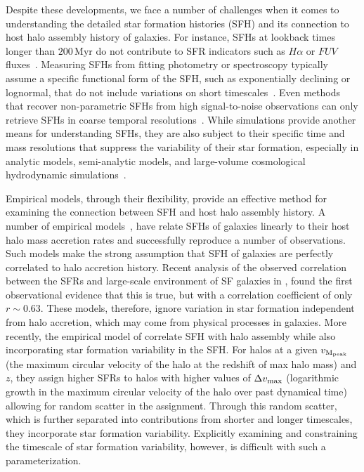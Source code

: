 \documentclass[12pt, letterpaper, preprint, tighten]{aastex62}
\newcommand{\edt}[1]{{\color{dred}{\bf} #1}}
\begin{document}
Despite these developments, we face a number of challenges when it comes
to understanding the detailed star formation histories (SFH) and its
connection to host halo assembly history of galaxies.
For instance, SFHs at lookback times longer than $200\,\mathrm{Myr}$
do not contribute to SFR indicators such as $H\alpha$ or $FUV$ fluxes~\cite{sparre2017}.
Measuring SFHs from fitting photometry or spectroscopy typically
assume a specific functional form of the SFH, such as exponentially
declining or lognormal, that do not include variations on short
timescales~\citep[\emph{e.g.}][]{wilkinson2017, carnall2018}.
Even methods that recover non-parametric SFHs from high signal-to-noise
observations can only retrieve SFHs in coarse temporal resolutions~\citep[\emph{e.g.}][]{tojeiro2009, leja2018a}.
While simulations provide another means for understanding SFHs,
they are also subject to their specific time and mass resolutions that
suppress the variability of their star formation, especially in
analytic models, semi-analytic models, and large-volume cosmological
hydrodynamic simulations~\citep[][see also Figure~\ref{fig:illsfh}]{sparre2015, sparre2017}.

Empirical models, \edt{through their} flexibility, provide an effective 
method for examining the connection between SFH and host halo assembly 
history. A number of empirical models~\citep{taghizadeh-popp2015, becker2015, rodriguez-puebla2016a, mitra2017, cohn2017, moster2017},
have relate SFHs of galaxies linearly to their host halo mass accretion
rates and successfully reproduce a number of observations. Such models
make the strong assumption that SFH of galaxies are perfectly correlated
to halo accretion history. 
\edt{Recent analysis of the observed correlation
between the SFRs and large-scale environment of SF galaxies in \cite{tinker2018b},
found the first observational evidence that this is true, but with a 
correlation coefficient of only $r \sim 0.63$.}
These models,
therefore, ignore variation in star formation independent from halo accretion,
which may come from physical processes in galaxies. More recently, the empirical
model of \cite{behroozi2018} correlate SFH
with halo assembly while also incorporating star formation variability in
the SFH. For halos at a given $v_{\rm M_{peak}}$ (the maximum circular
velocity of the halo at the redshift of max halo mass) and $z$, they
assign higher SFRs to halos with higher values of $\Delta v_{\rm max}$
(logarithmic growth in the maximum circular velocity of the halo over past dynamical time)
allowing for random scatter in the assignment. Through this random scatter,
which is further separated into contributions from shorter and longer timescales,
they incorporate star formation variability. Explicitly examining and constraining
the timescale of star formation variability, however, is difficult with such a
parameterization.
\end{document}
